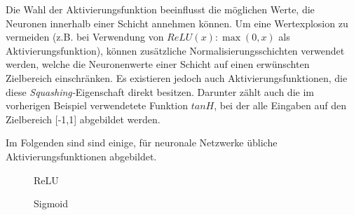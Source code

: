 Die Wahl der Aktivierungsfunktion beeinflusst die möglichen
Werte, die Neuronen innerhalb einer Schicht annehmen können. Um eine
Wertexplosion zu vermeiden (z.B. bei Verwendung von $ReLU(x): \max(0,x)$ als
Aktivierungsfunktion), können zusätzliche Normalisierungsschichten verwendet
werden, welche die Neuronenwerte einer Schicht auf einen erwünschten Zielbereich
einschränken. Es existieren jedoch auch Aktivierungsfunktionen, die diese
\emph{Squashing-}Eigenschaft direkt besitzen. Darunter zählt auch die im
vorherigen Beispiel verwendetete Funktion $tanH$, bei der alle Eingaben auf den
Zielbereich [-1,1] abgebildet werden.

Im Folgenden sind sind einige, für neuronale Netzwerke übliche
Aktivierungsfunktionen abgebildet.\bigskip

\begin{figure}[H]
    \begin{minipage}{0.45\textwidth}
        \begin{center}
        \end{center}
        \caption{ReLU}
    \end{minipage}\hfill
    \begin{minipage}{0.45\textwidth}
        \begin{center}
        \end{center}
        \caption{Sigmoid}
    \end{minipage}
\end{figure}
%
